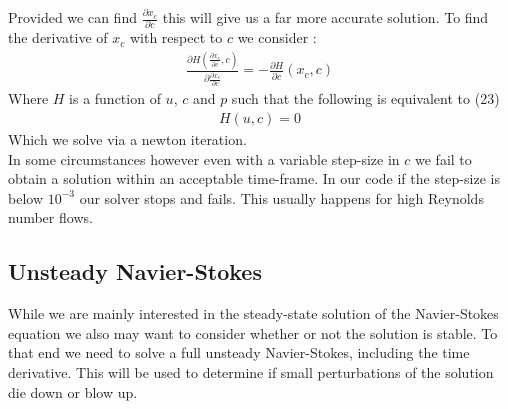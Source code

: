 \documentclass[11pt,twoside,a4paper]{article}
\begin{document}
Provided we can find $\frac{\partial x_c}{\partial c}$ this will give us a far more accurate solution.
To find the derivative of $x_c$ with respect to $c$ we consider :\\
\begin{align}
\frac{\partial H (\frac{\partial x_c}{\partial c},c)}{\partial \frac{\partial x_c}{\partial c}}  = - \frac{\partial H}{\partial c}(x_c,c)
\end{align}
Where $H$ is a function of $u$, $c$ and $p$ such that the following is equivalent to (23)
\begin{align*}
H(u,c) = 0
\end{align*}
Which we solve via a newton iteration.\\
In some circumstances however even with a variable step-size in $c$ we fail to obtain a solution within an acceptable time-frame. In our code if the step-size is below $10^{-3}$ our solver stops and fails. This usually happens for high Reynolds number flows.

\subsection{Unsteady Navier-Stokes}

While we are mainly interested in the steady-state solution of the Navier-Stokes equation we also may want to consider whether or not the solution is stable. To that end we need to solve a full unsteady Navier-Stokes, including the time derivative. This will be used to determine if small perturbations of the solution die down or blow up.
\end{document}
